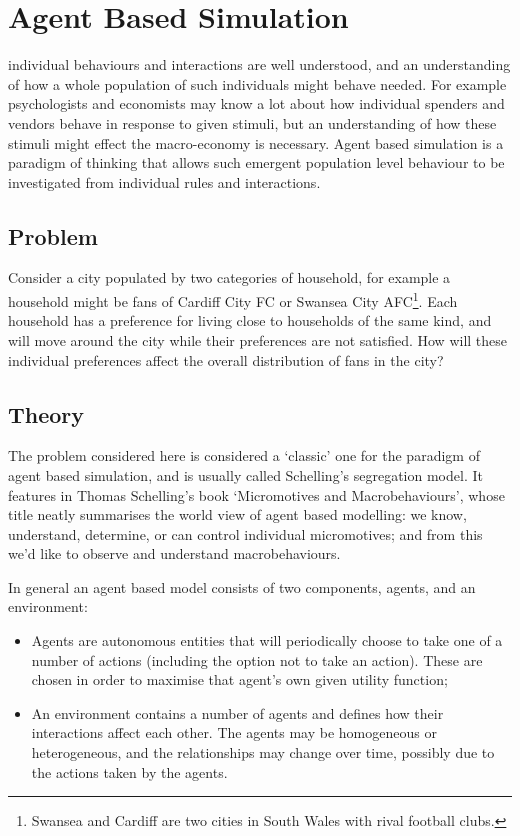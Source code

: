 \chapter[Agent Based Simulation]{Agent Based Simulation}\label{chp:agent_based_simulation}

 individual behaviours and
interactions are well understood,
and an understanding of how a whole population of such
individuals might behave needed. For example psychologists and economists may know a
lot about how individual spenders and vendors behave in response to given
stimuli, but an understanding of how these stimuli might effect the
macro-economy is necessary.
Agent based simulation is a paradigm of
thinking that allows such emergent population level behaviour to be investigated
from individual rules and interactions.

\section{Problem}\label{sec:problem}

Consider a city populated by two categories of household, for example a household
might be fans of Cardiff City FC or Swansea City AFC\footnote{Swansea and
Cardiff are two cities in South Wales with rival football clubs.}.
Each household has a
preference for living close to households of the same kind, and will move
around the city while their preferences are not satisfied.
How will these individual preferences affect the overall distribution of fans in
the city?

\section{Theory}\label{sec:theory}

The problem considered here is considered a `classic' one for the paradigm of
agent based simulation, and is usually called Schelling's segregation model.
It features in Thomas Schelling's book `Micromotives and
Macrobehaviours'\autocite{schelling2006micromotives}, whose
title neatly summarises the world view of agent based modelling: we know,
understand, determine, or can control individual micromotives; and from this
we'd like to observe and understand macrobehaviours.

In general an agent based model consists of two components, agents, and an
environment:

\begin{itemize}
  \item Agents are autonomous entities that will periodically choose to take one
        of a number of actions (including the option not to take an action).
        These are chosen in order to maximise that agent's own given utility
        function;
  \item An environment contains a number of agents and defines how their
        interactions affect each other.
        The agents may be homogeneous or heterogeneous, and the
        relationships may change over time, possibly due to the actions taken
        by the agents.
\end{itemize}

